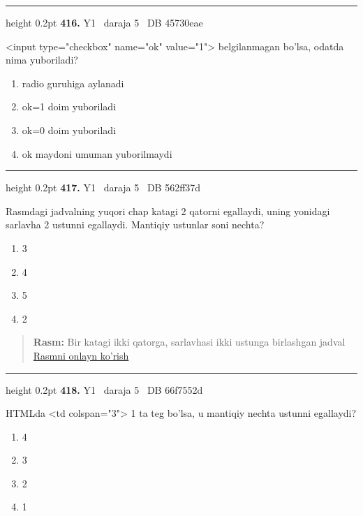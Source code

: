 \documentclass[10pt,a4paper,oneside]{article}
\begin{document}
\vspace{2mm}\hrule height 0.2pt \vspace{4mm}
\hypertarget{q416}{\textbf{\color{ink}416.}}  {\color{muted}\scriptsize Y1 \textbullet\ daraja 5 \textbullet\ DB 45730eae}
\par
\textless{}input type="checkbox" name="ok" value="1"\textgreater{} belgilanmagan bo'lsa, odatda nima yuboriladi?
\begin{enumerate}[label=\Alph*),leftmargin=9mm]
\item radio guruhiga aylanadi
\item ok=1 doim yuboriladi
\item ok=0 doim yuboriladi
\item ok maydoni umuman yuborilmaydi
\end{enumerate}
\vspace{2mm}\hrule height 0.2pt \vspace{4mm}
\hypertarget{q417}{\textbf{\color{ink}417.}}  {\color{muted}\scriptsize Y1 \textbullet\ daraja 5 \textbullet\ DB 562ff37d}
\par
Rasmdagi jadvalning yuqori chap katagi 2 qatorni egallaydi, uning yonidagi sarlavha 2 ustunni egallaydi. Mantiqiy ustunlar soni nechta?
\begin{enumerate}[label=\Alph*),leftmargin=9mm]
\item 3
\item 4
\item 5
\item 2
\end{enumerate}
\begin{quote}\footnotesize\color{muted}\textbf{Rasm:} Bir katagi ikki qatorga, sarlavhasi ikki ustunga birlashgan jadval\\
\href{https://github.com/sarvar9417/attestatsiya/blob/main/public/graphics-web-v2/html_table.svg}{Rasmni onlayn ko'rish}
\end{quote}
\vspace{2mm}\hrule height 0.2pt \vspace{4mm}
\hypertarget{q418}{\textbf{\color{ink}418.}}  {\color{muted}\scriptsize Y1 \textbullet\ daraja 5 \textbullet\ DB 66f7552d}
\par
HTMLda \textless{}td colspan="3"\textgreater{} 1 ta teg bo'lsa, u mantiqiy nechta ustunni egallaydi?
\begin{enumerate}[label=\Alph*),leftmargin=9mm]
\item 4
\item 3
\item 2
\item 1
\end{enumerate}
\end{document}
